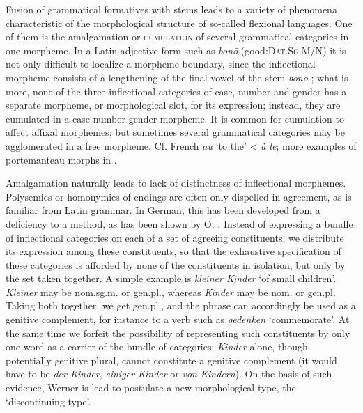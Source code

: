 Fusion of grammatical formatives with stems leads to a variety of phenomena characteristic of the morphological structure of so-called flexional languages. One of them is the amalgamation or \textsc{cumulation} of several grammatical categories in one morpheme. In a Latin adjective form such as \textit{bon\=o} (good:\textsc{Dat.Sg.M/N}) it is not only difficult to localize a morpheme boundary, since the inflectional morpheme consists of a lengthening of the final vowel of the stem \textit{bono}{}-; what is more, none of the three inflectional categories of case, number and gender has a separate morpheme, or morphological slot, for its expression; instead, they are cumulated in a case-number-gender morpheme. It is common for cumulation to affect affixal morphemes; but sometimes several grammatical categories may be agglomerated in a free morpheme. Cf. French \textit{au} ‘to the’ {\textless} \textit{à le}; more examples of portemanteau morphs in \citealt[§~6]{JeffersEtAl1980}.

Amalgamation naturally leads to lack of distinctness of inflectional morphemes. Polysemies or homonymies of endings are often only dispelled in agreement, as is familiar from Latin grammar. In German, this has been developed from a deficiency to a method, as has been shown by O. \citet{Werner1979}. Instead of expressing a bundle of inflectional categories on each of a set of agreeing constituents, we distribute its expression among these constituents, so that the exhaustive specification of these categories is afforded by none of the constituents in isolation, but only by the set taken together. A simple example is \textit{kleiner Kinder} ‘of small children’. \textit{Kleiner} may be nom.sg.m. or gen.pl., whereas \textit{Kinder} may be nom. or gen.pl. Taking both together, we get gen.pl., and the phrase can accordingly be used as a genitive complement, for instance to a verb such as \textit{gedenken} ‘commemorate’. At the same time we forfeit the possibility of representing such constituents by only one word as a carrier of the bundle of categories; \textit{Kinder} alone, though potentially genitive plural, cannot constitute a genitive complement (it would have to be \textit{der Kinder}, \textit{einiger Kinder} or \textit{von Kindern}). On the basis of such evidence, Werner is lead to postulate a new morphological type, the ‘discontinuing type’.

